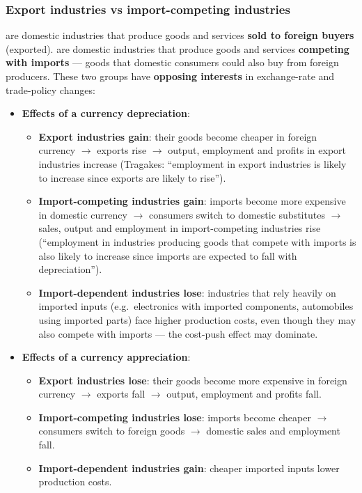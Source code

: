 \subsubsection*{Export industries vs import-competing industries}
 are domestic industries that produce goods and services \textbf{sold to foreign buyers} (exported).  are domestic industries that produce goods and services \textbf{competing with imports} --- goods that domestic consumers could also buy from foreign producers. These two groups have \textbf{opposing interests} in exchange-rate and trade-policy changes:
\begin{itemize}
  \item \textbf{Effects of a currency depreciation}:
  \begin{itemize}
    \item \textbf{Export industries gain}: their goods become cheaper in foreign currency $\to$ exports rise $\to$ output, employment and profits in export industries increase (Tragakes: ``employment in export industries is likely to increase since exports are likely to rise'').
    \item \textbf{Import-competing industries gain}: imports become more expensive in domestic currency $\to$ consumers switch to domestic substitutes $\to$ sales, output and employment in import-competing industries rise (``employment in industries producing goods that compete with imports is also likely to increase since imports are expected to fall with depreciation'').
    \item \textbf{Import-dependent industries lose}: industries that rely heavily on imported inputs (e.g.\ electronics with imported components, automobiles using imported parts) face higher production costs, even though they may also compete with imports --- the cost-push effect may dominate.
  \end{itemize}
  \item \textbf{Effects of a currency appreciation}:
  \begin{itemize}
    \item \textbf{Export industries lose}: their goods become more expensive in foreign currency $\to$ exports fall $\to$ output, employment and profits fall.
    \item \textbf{Import-competing industries lose}: imports become cheaper $\to$ consumers switch to foreign goods $\to$ domestic sales and employment fall.
    \item \textbf{Import-dependent industries gain}: cheaper imported inputs lower production costs.

\end{itemize}
\end{itemize}
